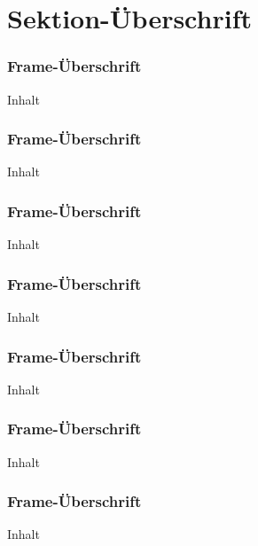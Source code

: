 

\author[Ben Deitmar]{Nix}


\beamertemplatenavigationsymbolsempty{}




\section{Sektion-Überschrift}

\begin{frame}
	\frametitle{Frame-Überschrift}
	Inhalt
\end{frame}


\begin{frame}
	\frametitle{Frame-Überschrift}
	Inhalt
\end{frame}


\begin{frame}
	\frametitle{Frame-Überschrift}
	Inhalt
\end{frame}


\begin{frame}
	\frametitle{Frame-Überschrift}
	Inhalt
\end{frame}


\begin{frame}
	\frametitle{Frame-Überschrift}
	Inhalt
\end{frame}


\begin{frame}
	\frametitle{Frame-Überschrift}
	Inhalt
\end{frame}


\begin{frame}
	\frametitle{Frame-Überschrift}
	Inhalt
\end{frame}














